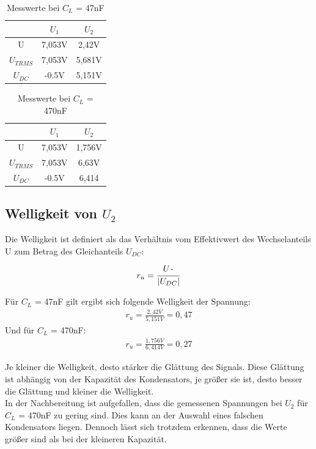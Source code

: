 \documentclass{article}
\begin{document}
\begin{table}[h]
  \begin{center}
\begin{tabular}{|c|c|c|}
  \hline
  & $U_{1}$ & $U_{2}$  \\
  \hline
  U\raisebox{-0.9ex}{\~{}} & 7,053V & 2,42V\\
  \hline
  $U_{TRMS}$ & 7,053V&5,681V\\
  \hline
  $U_{DC}$ & -0.5V&5,151V\\
  \hline
\end{tabular}
\caption{Messwerte bei $C_L$ = 47nF}
\end{center}
\end{table}

\begin{table}[h]
  \begin{center}
\begin{tabular}{|c|c|c|}
  \hline
  & $U_{1}$ & $U_{2}$  \\
  \hline
  U\raisebox{-0.9ex}{\~{}} & 7,053V & 1,756V\\
  \hline
  $U_{TRMS}$ & 7,053V & 6,63V\\
  \hline
  $U_{DC}$ & -0.5V  & 6,414\\
  \hline
\end{tabular}
\caption{Messwerte bei $C_L$ = 470nF}
\end{center}
\end{table}

\subsection{Welligkeit von $U_2$}

Die Welligkeit ist definiert als das Verhältnis vom Effektivwert des Wechselanteils U\raisebox{-0.9ex}{\~{}} zum Betrag des Gleichanteils $U_{DC}$:

\begin{align*}
  r_u = \frac{U\raisebox{-0.9ex}{\~{}}}{|U_{DC}|}
\end{align*}

Für $C_L$ = 47nF gilt ergibt sich folgende Welligkeit der Spannung:
\begin{align*}
  r_u = \frac{2,42V}{5,151V} = 0,47
\end{align*}
Und für $C_L$ = 470nF:
\begin{align*}
  r_u = \frac{1,756V}{6,414V} = 0,27
\end{align*}

Je kleiner die Welligkeit, desto stärker die Glättung des Signals. Diese Glättung ist abhängig von der Kapazität des Kondensators, je größer sie ist, desto besser die Glättung und kleiner die Welligkeit.
\\ In der Nachbereitung ist aufgefallen, dass die gemessenen Spannungen bei $U_2$ für $C_L$ = 470nF zu gering sind. Dies kann an der Auswahl eines falschen Kondensators liegen.
Dennoch lässt sich trotzdem erkennen, dass die Werte größer sind als bei der kleineren Kapazität.
\end{document}

